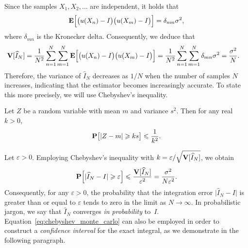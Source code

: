 Since the samples $X_1, X_2, \dotsc$ are independent,
it holds that
\[
    \mathbf E\Bigl[\bigl(u(X_n) - I\bigr) \bigl(u(X_m) - I\bigr)\Bigr] = \delta_{nm} \sigma^2,
\]
where $\delta_{mn}$ is the Kronecker delta.
Consequently, we deduce that
\begin{align*}
    \mathbf V[\widehat I_N]
    &=  \frac{1}{N^2} \sum_{n=1}^{N} \sum_{m=1}^{N} \mathbf E \Bigl[ \bigl(u(X_n) - I\bigr) \bigl(u(X_m) - I\bigr) \Bigr]
    =  \frac{1}{N^2} \sum_{n=1}^{N} \sum_{m=1}^{N} \delta_{mn} \sigma^2 = \frac{\sigma^2}{N}.
\end{align*}
Therefore, the variance of $\widehat I_N$ decreases as $1/N$ when the number of samples $N$ increases,
indicating that the estimator becomes increasingly accurate.
To state this more precisely,
we will use Chebyshev's inequality.
\begin{theorem}
    Let $Z$ be a random variable with mean $m$ and variance $s^2$.
    Then for any real $k > 0$,
    \[
        \mathbf P \bigl[ |Z - m|  \geqslant k s \bigr] \leqslant \frac{1}{k^2}.
    \]
\end{theorem}
Let $\varepsilon > 0$.
Employing Chebyshev's inequality with $k = \varepsilon / \sqrt{\mathbf V[\widehat I_N]}$,
we obtain
\begin{equation}
    \label{eq:chebyshev_monte_carlo}
    \mathbf P\Bigl[\lvert \widehat I_N - I \rvert \geqslant \varepsilon \Bigr]
    \leqslant \frac{\mathbf V[\widehat I_N]}{\varepsilon^2}
    = \frac{\sigma^2}{N \varepsilon^2}.
\end{equation}
Consequently, for any $\varepsilon > 0$,
the probability that the integration error $\bigl\lvert \widehat I_N - I \bigr\rvert$ is greater than or equal to $\varepsilon$ tends to zero in the limit as $N \to \infty$.
In probabilistic jargon, we say that $\widehat I_N$ converges \emph{in probability} to~$I$.
Equation~\eqref{eq:chebyshev_monte_carlo} can also be employed in order to construct a \emph{confidence interval} for the exact integral,
as we demonstrate in the following paragraph.


